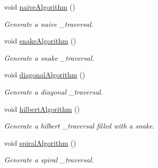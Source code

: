 \begin{DoxyCompactItemize}
$$void \hyperlink{classfi_1_1Traversal_a8b3a01741e62cd518347912971d9b503}{naive\+Algorithm} ()
\begin{DoxyCompactList}\small\item\em Generate a naive \+\_\+traversal. \end{DoxyCompactList}\item 
void \hyperlink{classfi_1_1Traversal_a2382a65146511efc3c56d5db303e0b2d}{snake\+Algorithm} ()
\begin{DoxyCompactList}\small\item\em Generate a snake \+\_\+traversal. \end{DoxyCompactList}\item 
void \hyperlink{classfi_1_1Traversal_af393d529ec262d13ca83dd98f39c2789}{diagonal\+Algorithm} ()
\begin{DoxyCompactList}\small\item\em Generate a diagonal \+\_\+traversal. \end{DoxyCompactList}\item 
void \hyperlink{classfi_1_1Traversal_a77545ba72aaf6831409ce8bcc399a7eb}{hilbert\+Algorithm} ()
\begin{DoxyCompactList}\small\item\em Generate a hilbert \+\_\+traversal filled with a snake. \end{DoxyCompactList}\item 
void \hyperlink{classfi_1_1Traversal_af932ac9b0af7fb02dee64fd544229597}{spiral\+Algorithm} ()
\begin{DoxyCompactList}\small\item\em Generate a spiral \+\_\+traversal. \end{DoxyCompactList}\end{DoxyCompactItemize}
